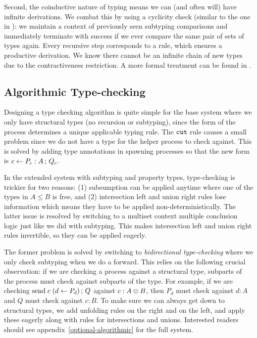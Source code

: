 \documentclass[a4paper,USenglish]{lipics-v2016}
\begin{document}
Second, the coinductive nature of typing means we can (and often will) have infinite derivations. We combat this by using a cyclicity check (similar to the one in \cite{GayH05}): we maintain a context of previously seen subtyping comparisons and immediately terminate with success if we ever compare the same pair of sets of types again. Every recursive step corresponds to a rule, which ensures a productive derivation. We know there cannot be an infinite chain of new types due to the contractiveness restriction. A more formal treatment can be found in \cite{StoneS2005}.


\subsection{Algorithmic Type-checking}

Designing a type checking algorithm is quite simple for the base system where we only have structural types (no recursion or subtyping), since the form of the process determines a unique applicable typing rule. The $\texttt{cut}$ rule causes a small problem since we do not have a type for the helper process to check against. This is solved by adding type annotations in spawning processes so that the new form is $c \leftarrow P_c : A \,;\, Q_c$.

In the extended system with subtyping and property types, type-checking is trickier for two reasons: (1) subsumption can be applied anytime where one of the types in $A \le B$ is free, and (2) intersection left and union right rules lose information which means they have to be applied non-deterministically. The latter issue is resolved by switching to a multiset context multiple conclusion logic just like we did with subtyping. This makes intersection left and union right rules invertible, so they can be applied eagerly.

The former problem is solved by switching to \emph{bidirectional type-checking} where we only check subtyping when we do a forward. This relies on the following crucial observation: if we are checking a process against a structural type, subparts of the process must check against subparts of the type. For example, if we are checking $\mathrm{send}\; c \; (d \leftarrow P_d) \,;\, Q$ against $c : A \otimes B$, then $P_d$ must check against $d : A$ and $Q$ must check against $c : B$. To make sure we can always get down to structural types, we add unfolding rules on the right and on the left, and apply these eagerly along with rules for intersections and unions. Interested readers should see appendix~\ref{optional-algorithmic} for the full system.
\end{document}
